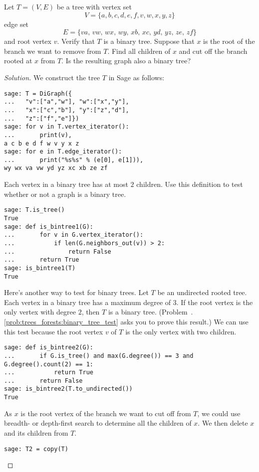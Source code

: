 \begin{example}
\label{eg:trees_forests:branch_cut_binary_tree}
Let $T = (V, E)$ be a tree with vertex set
\[
V
=
\{a, b, c, d, e, f, v, w, x, y, z\}
\]
edge set
\[
E
=
\{va,\, vw,\, wx,\, wy,\, xb,\, xc,\, yd,\, yz,\, ze,\, zf\}
\]
and root vertex $v$. Verify that $T$ is a binary tree. Suppose that
$x$ is the root of the branch we want to remove from $T$. Find all
children of $x$ and cut off the branch rooted at $x$ from $T$. Is the
resulting graph also a binary tree?
\end{example}

\begin{proof}[Solution]
We construct the tree $T$ in Sage as follows:
\begin{lstlisting}
sage: T = DiGraph({
...   "v":["a","w"], "w":["x","y"],
...   "x":["c","b"], "y":["z","d"],
...   "z":["f","e"]})
sage: for v in T.vertex_iterator():
...       print(v),
a c b e d f w v y x z
sage: for e in T.edge_iterator():
...       print("%s%s" % (e[0], e[1])),
wy wx va vw yd yz xc xb ze zf
\end{lstlisting}
Each vertex in a binary tree has at most $2$ children. Use this
definition to test whether or not a graph is a binary tree.
\begin{lstlisting}
sage: T.is_tree()
True
sage: def is_bintree1(G):
...       for v in G.vertex_iterator():
...           if len(G.neighbors_out(v)) > 2:
...               return False
...       return True
sage: is_bintree1(T)
True
\end{lstlisting}
Here's another way to test for binary trees. Let $T$ be an undirected
rooted tree. Each vertex in a binary tree has a maximum degree of
$3$. If the root vertex is the only vertex with degree $2$, then $T$
is a binary tree.
(Problem~\thechapter.\ref{prob:trees_forests:binary_tree_test} asks
you to prove this result.) We can use this test because the root
vertex $v$ of $T$ is the only vertex with two children.
\begin{lstlisting}
sage: def is_bintree2(G):
...       if G.is_tree() and max(G.degree()) == 3 and G.degree().count(2) == 1:
...           return True
...       return False
sage: is_bintree2(T.to_undirected())
True
\end{lstlisting}
As $x$ is the root vertex of the branch we want to cut off from $T$,
we could use breadth- or depth-first search to determine all the
children of $x$. We then delete $x$ and its children from $T$.
\begin{lstlisting}
sage: T2 = copy(T)

\end{lstlisting}
\end{proof}
